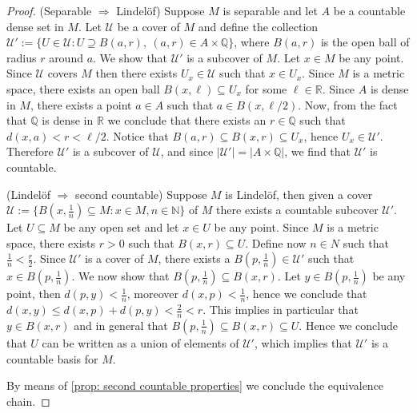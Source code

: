 \begin{proof}
  (Separable \(\Rightarrow\) Lindelöf) Suppose \(M\) is separable and let \(A\) 
  be a countable dense set in \(M\). Let \(\mathcal U\) be a cover of \(M\) and
  define the collection \(\mathcal U' := \{U \in \mathcal U : U \supseteq B(a,
  r),\ (a, r) \in A \times \mathbb{Q}\}\), where \(B(a,r)\) is the open ball of
  radius \(r\) around \(a\). We show that \(\mathcal U'\) is a subcover of
  \(M\).
  Let \(x \in M\) be any point. Since \(\mathcal U\) covers \(M\) then there
  exists \(U_x \in \mathcal U\) such that \(x \in U_x\). Since \(M\) is a metric
  space, there exists an open ball \(B(x, \ell) \subseteq U_x\) for some \(\ell
  \in \mathbb{R}\).
  Since \(A\) is dense in \(M\), there exists a point \(a \in A\) such that \(a
  \in B(x, \ell/2)\). Now, from the fact that \(\mathbb{Q}\) is dense in
  \(\mathbb{R}\) we conclude that there exists an \(r \in \mathbb{Q}\) such that
  \(d(x, a) < r < \ell/2\). Notice that \(B(a, r) \subseteq B(x, r) \subseteq
  U_x\), hence \(U_x \in \mathcal U'\). Therefore \(\mathcal U'\) is a subcover
  of \(\mathcal U\), and since \(|\mathcal U'| = |A \times \mathbb{Q}|\), we
  find that \(\mathcal U'\) is countable.

  (Lindelöf \(\Rightarrow\) second countable) Suppose \(M\) is Lindelöf, then
  given a cover \(\mathcal U := \{B(x, \frac{1}{n}) \subseteq M : x \in M, n \in
  \mathbb{N}\}\) of \(M\) there exists a countable subcover \(\mathcal U'\). Let
  \(U \subseteq M\) be any open set and let \(x \in U\) be any point. Since
  \(M\) is a metric space, there exists \(r > 0\) such that \(B(x, r) \subseteq
  U\). Define now \(n \in N\) such that \(\frac 1 n < \frac r 2\). Since
  \(\mathcal U'\) is a cover of \(M\), there exists a \(B(p, \frac 1 n) \in
  \mathcal U'\) such that \(x \in B(p, \frac 1 n)\). We now show that \(B(p,
  \frac 1 n) \subseteq B(x, r)\). Let \(y \in B(p, \frac 1 n)\) be any point,
  then \(d(p, y) < \frac 1 n\), moreover \(d(x, p) < \frac 1 n\), hence we
  conclude that \(d(x, y) \leq d(x, p) + d(p, y) < \frac 2 n < r\). This implies
  in particular that \(y \in B(x, r)\) and in general that \(B(p, \frac 1 n)
  \subseteq B(x, r) \subseteq U\). Hence we conclude that \(U\) can be written
  as a union of elements of \(\mathcal U'\), which implies that \(\mathcal U'\) 
  is a countable basis for \(M\).

  By means of \cref{prop: second countable properties} we conclude the
  equivalence chain.
\end{proof}

